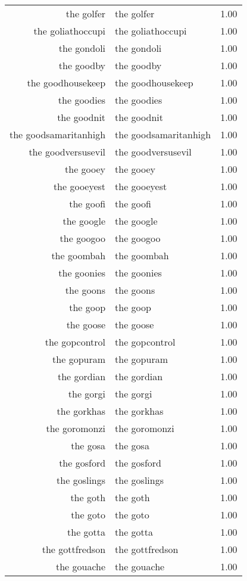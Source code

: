 \begin{table}[ht]
\begin{tabular}{rlr}
  the golfer & the golfer & 1.00 \\ 
  the goliathoccupi & the goliathoccupi & 1.00 \\ 
  the gondoli & the gondoli & 1.00 \\ 
  the goodby & the goodby & 1.00 \\ 
  the goodhousekeep & the goodhousekeep & 1.00 \\ 
  the goodies & the goodies & 1.00 \\ 
  the goodnit & the goodnit & 1.00 \\ 
  the goodsamaritanhigh & the goodsamaritanhigh & 1.00 \\ 
  the goodversusevil & the goodversusevil & 1.00 \\ 
  the gooey & the gooey & 1.00 \\ 
  the gooeyest & the gooeyest & 1.00 \\ 
  the goofi & the goofi & 1.00 \\ 
  the google & the google & 1.00 \\ 
  the googoo & the googoo & 1.00 \\ 
  the goombah & the goombah & 1.00 \\ 
  the goonies & the goonies & 1.00 \\ 
  the goons & the goons & 1.00 \\ 
  the goop & the goop & 1.00 \\ 
  the goose & the goose & 1.00 \\ 
  the gopcontrol & the gopcontrol & 1.00 \\ 
  the gopuram & the gopuram & 1.00 \\ 
  the gordian & the gordian & 1.00 \\ 
  the gorgi & the gorgi & 1.00 \\ 
  the gorkhas & the gorkhas & 1.00 \\ 
  the goromonzi & the goromonzi & 1.00 \\ 
  the gosa & the gosa & 1.00 \\ 
  the gosford & the gosford & 1.00 \\ 
  the goslings & the goslings & 1.00 \\ 
  the goth & the goth & 1.00 \\ 
  the goto & the goto & 1.00 \\ 
  the gotta & the gotta & 1.00 \\ 
  the gottfredson & the gottfredson & 1.00 \\ 
  the gouache & the gouache & 1.00 \\ 

\end{tabular}
\end{table}
